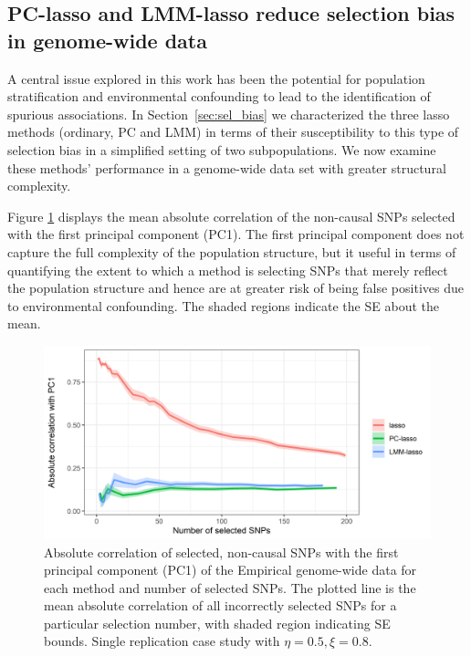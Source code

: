 \subsection{PC-lasso and LMM-lasso reduce selection bias in genome-wide data}

A central issue explored in this work has been the potential for population stratification and environmental confounding to lead to the identification of spurious associations. In Section~\ref{sec:sel_bias} we characterized the three lasso methods (ordinary, PC and LMM) in terms of their susceptibility to this type of selection bias in a simplified setting of two subpopulations. We now examine these methods' performance in a genome-wide data set with greater structural complexity. 

Figure \ref{fig:gw_pc1_corr} displays the mean absolute correlation of the non-causal SNPs selected with the first principal component (PC1). The first principal component does not capture the full complexity of the population structure, but it useful in terms of quantifying the extent to which a method is selecting SNPs that merely reflect the population structure and hence are at greater risk of being false positives due to environmental confounding. The shaded regions indicate the SE about the mean.

\begin{figure}[H]
\centering
\includegraphics[scale = 0.9]{figures/figure_07.png}
\caption{Absolute correlation of selected, non-causal SNPs with the first principal component (PC1) of the Empirical genome-wide data for each method and number of selected SNPs. The plotted line is the mean absolute correlation of all incorrectly selected SNPs for a particular selection number, with shaded region indicating SE bounds. Single replication case study with $\eta = 0.5, \xi = 0.8$.}
\label{fig:gw_pc1_corr}
\end{figure}

